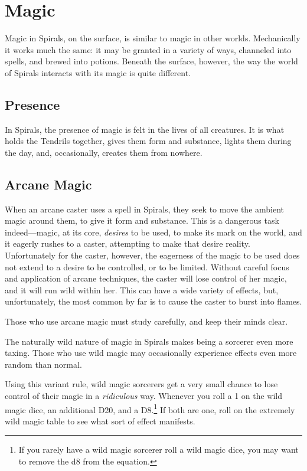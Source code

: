 \chapter{Magic}
\label{chapter:magic}

Magic in Spirals, on the surface, is similar to magic in other worlds.
Mechanically it works much the same: it may be granted in a variety of ways, channeled into spells, and brewed into potions.
Beneath the surface, however, the way the world of Spirals interacts with its magic is quite different.

\begin{multicols}{2}
\section{Presence}
In Spirals, the presence of magic is felt in the lives of all creatures.
It is what holds the Tendrils together, gives them form and substance, lights them during the day, and, occasionally, creates them from nowhere.


\section{Arcane Magic}
When an arcane caster uses a spell in Spirals, they seek to move the ambient magic around them, to give it form and substance.
This is a dangerous task indeed---magic, at its core, \textit{desires} to be used, to make its mark on the world, and it eagerly rushes to a caster, attempting to make that desire reality.
Unfortunately for the caster, however, the eagerness of the magic to be used does not extend to a desire to be controlled, or to be limited.
Without careful focus and application of arcane techniques, the caster will lose control of her magic, and it will run wild within her.
This can have a wide variety of effects, but, unfortunately, the most common by far is to cause the caster to burst into flames.

Those who use arcane magic must study carefully, and keep their minds clear.

\end{multicols}
The naturally wild nature of magic in Spirals makes being a sorcerer even more taxing.
Those who use wild magic may occasionally experience effects even more random than normal.

Using this variant rule, wild magic sorcerers get a very small chance to lose control of their magic in a \textit{ridiculous} way.
Whenever you roll a 1 on the wild magic dice, an additional D20, and a D8.\footnote{If you rarely have a wild magic sorcerer roll a wild magic dice, you may want to remove the d8 from the equation.}
If both are one, roll on the extremely wild magic table to see what sort of effect manifests.

